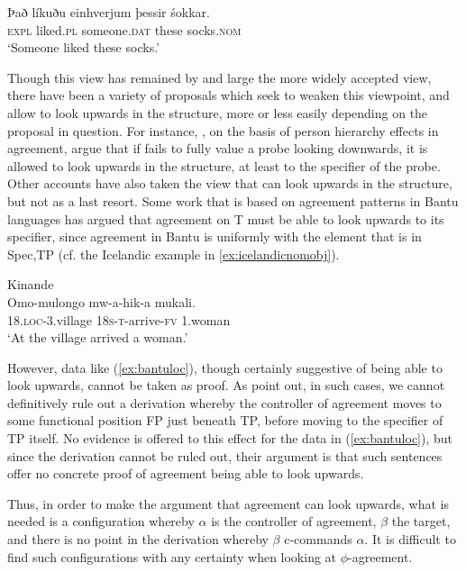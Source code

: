 \documentclass[output=paper
,modfonts
,nonflat]{langsci/langscibook}
\begin{document}
\begin{exe}
	\ex
	\gll Það líkuðu einhverjum þessir śokkar.\\
	\textsc{expl} liked.\textsc{pl} someone.\textsc{dat} these socks.\textsc{nom}\\
	\glt `Someone liked these socks.' \label{ex:icelandicnomobj}
\end{exe}
Though this view has remained by and large the more widely accepted view, there have been a variety of proposals which seek to weaken this viewpoint, and allow {\agr} to look upwards in the structure, more or less easily depending on the proposal in question.
For instance, \citet{bejarrezac2009}, on the basis of person hierarchy effects in agreement, argue that if {\agr} fails to fully value a probe looking downwards, it is allowed to look upwards in the structure, at least to the specifier of the probe.
Other accounts have also taken the view that {\agr} can look upwards in the structure, but not as a last resort.
Some work that is based on agreement patterns in Bantu languages has argued that agreement on T must be able to look upwards to its specifier, since agreement in Bantu is uniformly with the element that is in Spec,TP (cf. the Icelandic example in \ref{ex:icelandicnomobj}).

\begin{exe}
	\ex Kinande \citep{Baker2003}\\
	\gll Omo-mulongo mw-a-hik-a mukali.\\
	\textsc{18.loc}-3.village \textsc{18s-t-}arrive-\textsc{fv} 1.woman\\
	\glt `At the village arrived a woman.' \label{ex:bantuloc}
\end{exe} 
However, data like (\ref{ex:bantuloc}), though certainly suggestive of {\agr} being able to look upwards, cannot be taken as proof.
As \citet{premingerpolinsky2015} point out, in such cases, we cannot definitively rule out a derivation whereby the controller of agreement moves to some functional position FP just beneath TP, before moving to the specifier of TP itself.
No evidence is offered to this effect for the data in (\ref{ex:bantuloc}), but since the derivation cannot be ruled out, their argument is that such sentences offer no concrete proof of agreement being able to look upwards.

Thus, in order to make the argument that agreement can look upwards, what is needed is a configuration whereby $\alpha$ is the controller of agreement, $\beta$ the target, and there is no point in the derivation whereby $\beta$ c-commands $\alpha$.
It is difficult to find such configurations with any certainty when looking at $\phi$-agreement.
\end{document}
